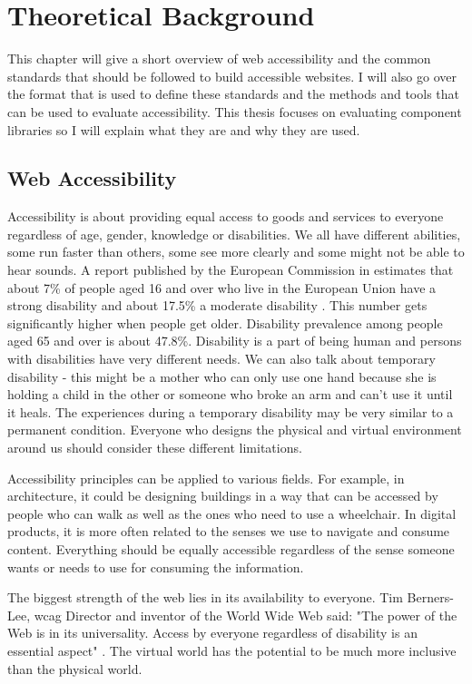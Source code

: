 \documentclass{master_thesis}
\begin{document}
\section{Theoretical Background}

This chapter will give a short overview of web accessibility and the common standards that should be followed to build accessible websites. I will also go over the format that is used to define these standards and the methods and tools that can be used to evaluate accessibility. This thesis focuses on evaluating component libraries so I will explain what they are and why they are used.
\subsection{Web Accessibility}

Accessibility is about providing equal access to goods and services to everyone regardless of age, gender, knowledge or disabilities. We all have different abilities, some run faster than others, some see more clearly and some might not be able to hear sounds. A report published by the European Commission in \citeyear{Grammenos2020} estimates that about 7\% of people aged 16 and over who live in the European Union have a strong disability and about 17.5\% a moderate disability \citep{Grammenos2020}. This number gets significantly higher when people get older. Disability prevalence among people aged 65 and over is about 47.8\%.  Disability is a part of being human and persons with disabilities have very different needs. We can also talk about temporary disability - this might be a mother who can only use one hand because she is holding a child in the other or someone who broke an arm and can't use it until it heals. The experiences during a temporary disability may be very similar to a permanent condition. Everyone who designs the physical and virtual environment around us should consider these different limitations.

Accessibility principles can be applied to various fields. For example, in architecture, it could be designing buildings in a way that can be accessed by people who can walk as well as the ones who need to use a wheelchair. In digital products, it is more often related to the senses we use to navigate and consume content. Everything should be equally accessible regardless of the sense someone wants or needs to use for consuming the information.

The biggest strength of the web lies in its availability to everyone. Tim Berners-Lee, \ac{wcag} Director and inventor of the World Wide Web said: "The power of the Web is in its universality. Access by everyone regardless of disability is an essential aspect" \citep{WWWC1997}. The virtual world has the potential to be much more inclusive than the physical world.
\end{document}
